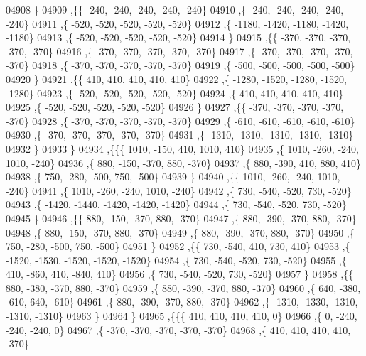 \begin{DoxyCode}
04908     \}
04909    ,\{\{  -240,  -240,  -240,  -240,  -240\}
04910     ,\{  -240,  -240,  -240,  -240,  -240\}
04911     ,\{  -520,  -520,  -520,  -520,  -520\}
04912     ,\{ -1180, -1420, -1180, -1420, -1180\}
04913     ,\{  -520,  -520,  -520,  -520,  -520\}
04914     \}
04915    ,\{\{  -370,  -370,  -370,  -370,  -370\}
04916     ,\{  -370,  -370,  -370,  -370,  -370\}
04917     ,\{  -370,  -370,  -370,  -370,  -370\}
04918     ,\{  -370,  -370,  -370,  -370,  -370\}
04919     ,\{  -500,  -500,  -500,  -500,  -500\}
04920     \}
04921    ,\{\{   410,   410,   410,   410,   410\}
04922     ,\{ -1280, -1520, -1280, -1520, -1280\}
04923     ,\{  -520,  -520,  -520,  -520,  -520\}
04924     ,\{   410,   410,   410,   410,   410\}
04925     ,\{  -520,  -520,  -520,  -520,  -520\}
04926     \}
04927    ,\{\{  -370,  -370,  -370,  -370,  -370\}
04928     ,\{  -370,  -370,  -370,  -370,  -370\}
04929     ,\{  -610,  -610,  -610,  -610,  -610\}
04930     ,\{  -370,  -370,  -370,  -370,  -370\}
04931     ,\{ -1310, -1310, -1310, -1310, -1310\}
04932     \}
04933    \}
04934   ,\{\{\{  1010,  -150,   410,  1010,   410\}
04935     ,\{  1010,  -260,  -240,  1010,  -240\}
04936     ,\{   880,  -150,  -370,   880,  -370\}
04937     ,\{   880,  -390,   410,   880,   410\}
04938     ,\{   750,  -280,  -500,   750,  -500\}
04939     \}
04940    ,\{\{  1010,  -260,  -240,  1010,  -240\}
04941     ,\{  1010,  -260,  -240,  1010,  -240\}
04942     ,\{   730,  -540,  -520,   730,  -520\}
04943     ,\{ -1420, -1440, -1420, -1420, -1420\}
04944     ,\{   730,  -540,  -520,   730,  -520\}
04945     \}
04946    ,\{\{   880,  -150,  -370,   880,  -370\}
04947     ,\{   880,  -390,  -370,   880,  -370\}
04948     ,\{   880,  -150,  -370,   880,  -370\}
04949     ,\{   880,  -390,  -370,   880,  -370\}
04950     ,\{   750,  -280,  -500,   750,  -500\}
04951     \}
04952    ,\{\{   730,  -540,   410,   730,   410\}
04953     ,\{ -1520, -1530, -1520, -1520, -1520\}
04954     ,\{   730,  -540,  -520,   730,  -520\}
04955     ,\{   410,  -860,   410,  -840,   410\}
04956     ,\{   730,  -540,  -520,   730,  -520\}
04957     \}
04958    ,\{\{   880,  -380,  -370,   880,  -370\}
04959     ,\{   880,  -390,  -370,   880,  -370\}
04960     ,\{   640,  -380,  -610,   640,  -610\}
04961     ,\{   880,  -390,  -370,   880,  -370\}
04962     ,\{ -1310, -1330, -1310, -1310, -1310\}
04963     \}
04964    \}
04965   ,\{\{\{   410,   410,   410,   410,     0\}
04966     ,\{     0,  -240,  -240,  -240,     0\}
04967     ,\{  -370,  -370,  -370,  -370,  -370\}
04968     ,\{   410,   410,   410,   410,  -370\}

\end{DoxyCode}
